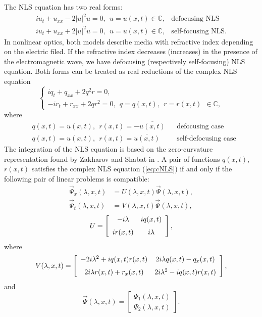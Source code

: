 \documentclass[12pt]{article}
\newcommand{\CC}{\mathbb C}
\newcommand{\beq}{\begin{equation}}
\newcommand{\eeq}{\end{equation}}
\begin{document}
The NLS equation has two real forms:
\begin{equation}
\label{eq:rNLS}
\begin{array}{ll}
i u_t +u_{xx} - 2 |u|^2 u=0, \ \ u=u(x,t)\in\CC, & \mbox{defocusing NLS} \\ 
i u_t +u_{xx} + 2 |u|^2 u=0, \ \ u=u(x,t)\in\CC, & \mbox{self-focusing NLS}.
\end{array}
\end{equation}
In nonlinear optics, both models describe media with refractive index depending on the electric filed. If the refractive index decreases (increases) in the presence of the electromagnetic wave, we have defocusing (respectively self-focusing) NLS equation. Both forms can be treated as real reductions of the complex NLS equation 
\beq\label{eq:cNLS}
\left\{
\begin{array}{l}
i q_t +q_{xx}+2 q^2 r=0, \\
-i r_t +r_{xx}+2 q r^2=0, \ \ q=q(x,t), \ \ r=r(x,t) \ \  \in\CC,
\end{array}
\right.
\eeq
where
\begin{align}
&q(x,t) = u(x,t), \ \ r(x,t) = -\overline{u(x,t)} & &\mbox{defocusing case}\\
&q(x,t) = u(x,t), \ \ r(x,t) = \overline{u(x,t)} & &\mbox{self-defocusing case}
\end{align}
The integration of the NLS equation is based on the zero-curvature representation found by Zakharov and Shabat in \cite{ZakharovShabat}.   
A pair of functions $q(x,t)$, $r(x,t)$ satisfies the complex NLS equation (\ref{eq:cNLS}) if and only if the following pair of linear problems is compatible: 
\begin{align}
\label{eq:zc_x}
\vec\Psi_x(\lambda,x,t)&=U(\lambda,x,t)\vec\Psi(\lambda,x,t),\\
\label{eq:zc_t}
\vec\Psi_t(\lambda,x,t)&=V(\lambda,x,t)\vec\Psi(\lambda,x,t),
\end{align}
$$
U=\left [\begin {array}{cc} -i \lambda & i q(x,t)
\\\noalign{\medskip} i r(x,t) & i \lambda\end {array}
\right ],
$$
where
$$
V(\lambda,x,t)= \left[\begin {array}{cc} -2 i \lambda^2 + i q(x,t) r(x,t) & 2 i \lambda q(x,t) - q_x(x,t)
\\\noalign{\medskip} 2 i \lambda r(x,t) + r_x(x,t) & 2 i \lambda^2- i q(x,t) r(x,t)  
\end {array}
\right ],
$$
and
$$
\vec\Psi(\lambda,x,t)= \left [\begin {array}{c} \Psi_1(\lambda,x,t) \\
\Psi_2(\lambda,x,t) \end {array}\right ].
$$
\end{document}
